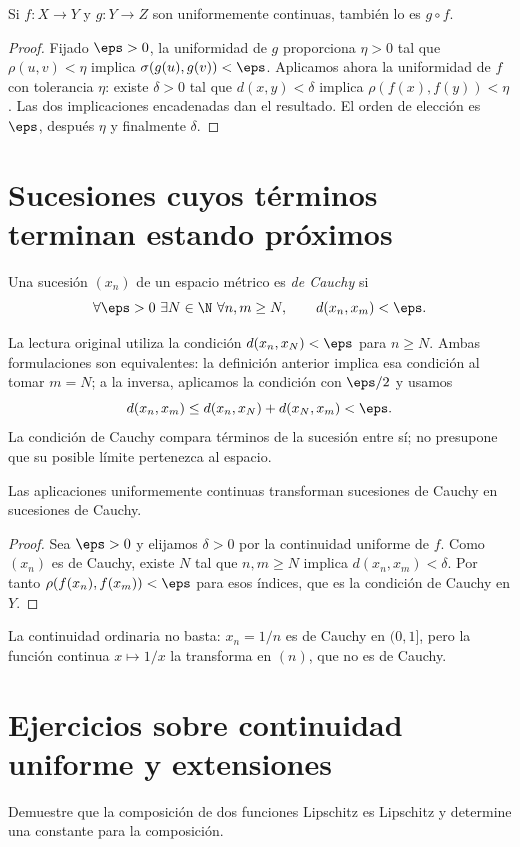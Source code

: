 \begin{proposicion}[Composición]\label{ch07:composicion}
Si $f:X\to Y$ y $g:Y\to Z$ son uniformemente continuas, también lo es $g\circ f$.
\end{proposicion}
\begin{proof}
Fijado $\eps>0$, la uniformidad de $g$ proporciona $\eta>0$ tal que $\rho(u,v)<\eta$ implica $\sigma(g(u),g(v))<\eps$. Aplicamos ahora la uniformidad de $f$ con tolerancia $\eta$: existe $\delta>0$ tal que $d(x,y)<\delta$ implica $\rho(f(x),f(y))<\eta$. Las dos implicaciones encadenadas dan el resultado. El orden de elección es $\eps$, después $\eta$ y finalmente $\delta$.
\end{proof}

\section{Sucesiones cuyos términos terminan estando próximos}
\begin{definicion}\label{ch07:cauchy}
Una sucesión $(x_n)$ de un espacio métrico es \emph{de Cauchy} si
\[
 \forall\eps>0\ \exists N\in\N\ \forall n,m\geq N,
 \qquad d(x_n,x_m)<\eps.
\]
\end{definicion}
La lectura original utiliza la condición $d(x_n,x_N)<\eps$ para $n\geq N$. Ambas formulaciones son equivalentes: la definición anterior implica esa condición al tomar $m=N$; a la inversa, aplicamos la condición con $\eps/2$ y usamos
\[
 d(x_n,x_m)\leq d(x_n,x_N)+d(x_N,x_m)<\eps.
\]
La condición de Cauchy compara términos de la sucesión entre sí; no presupone que su posible límite pertenezca al espacio.

\begin{teorema}\label{ch07:cauchy-imagen}
Las aplicaciones uniformemente continuas transforman sucesiones de Cauchy en sucesiones de Cauchy.
\end{teorema}
\begin{proof}
Sea $\eps>0$ y elijamos $\delta>0$ por la continuidad uniforme de $f$. Como $(x_n)$ es de Cauchy, existe $N$ tal que $n,m\geq N$ implica $d(x_n,x_m)<\delta$. Por tanto $\rho(f(x_n),f(x_m))<\eps$ para esos índices, que es la condición de Cauchy en $Y$.
\end{proof}
La continuidad ordinaria no basta: $x_n=1/n$ es de Cauchy en $(0,1]$, pero la función continua $x\mapsto1/x$ la transforma en $(n)$, que no es de Cauchy.

\section{Ejercicios sobre continuidad uniforme y extensiones}
\begin{ejercicio}\label{ej:lectura-7-1}
Demuestre que la composición de dos funciones Lipschitz es Lipschitz y determine una constante para la composición.
\end{ejercicio}


